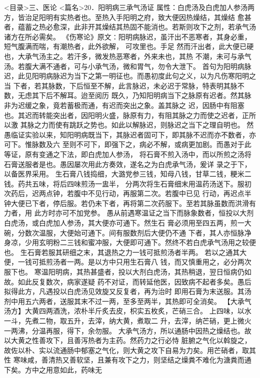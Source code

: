 \documentclass[a4paper,12pt,UTF8,twoside]{ctexbook}
\begin{document}
<目录>三、医论
<篇名>20．阳明病三承气汤证
属性：白虎汤及白虎加人参汤两方，皆治足阳明有实热者也。至热入手阳明之府，致大便因热燥结，其燥结 
愈甚者，蕴蓄之热必愈深，此非开其燥结其热固不能消也。若斯则攻下之剂，若承气汤诸方在所必需矣。 
《伤寒论》原文∶阳明病脉迟，虽汗出不恶寒者，其身必重，短气腹满而喘，有潮热者，此外欲解， 
可攻里也。手足 然而汗出者，此大便已硬也，大承气汤主之。若汗多，微发热恶寒者，外来未也，其热 
不潮，未可与承气汤。若腹大满不通者，可与小承气汤，微和胃气，勿令大泄下。 
首句为阳明病脉迟，此见阳明病脉迟为当下之第一明征也。而愚初度此句之义，以为凡伤寒阳明之当 
下者，若其脉数，下后恒至不解，此言脉迟，未必迟于常脉，特表明其脉不数，无虑其下后不解耳。迨至阅历 
既久，乃知阳明病当下之脉原有迟者。然其脉非为迟缓之象，竟若蓄极而通，有迟而突出之象。盖其脉之 
迟，因肠中有阻塞也。其迟而转能突出者，因阳明火盛，脉原有力，有阻其脉之力而使之迟者，正所以激 
其脉之力而使有跳跃之势也。如此以解脉迟，则脉迟之当下之理自明也。 
然愚临证实验以来，知阳明病既当下，其脉迟者固可下，即其脉不迟而亦不数者，亦可下。惟脉数及六 
至则不可下，即强下之，病必不解，或病更加剧。而愚对于此等证，原有变通之下法，即白虎加人参汤， 
将石膏不煎入汤中，而以所煎之汤将石膏送服者是也。愚因屡次用此方奏效，遂名之为白虎承气汤，爰详 
录之于下，以备医界采用。 
生石膏八钱捣细，大潞党参三钱，知母八钱，甘草二钱，粳米二钱。药共五味，将后四味煎汤一盅半， 
分两次将生石膏细末用温药汤送下。服初次药后，迟两点钟，若腹中不见行动，再服第二次。若腹中已见 
行动，再迟点半钟大便已下者，停后服。若仍未下者，再将第二次药服下。至若其脉虽数而洪滑有力者，用 
此方时亦可不加党参。 
愚从前遇寒温证之当下而脉象数者，恒投以大剂白虎汤，或白虎加人参汤，其大便亦可通下。然生石 
膏必须用至四五两，煎一大碗，分数次温服，大便始可通下。间有服数剂后大便仍不通 
下者，其人亦恒脉净身凉，少用玄明粉二三钱和蜜冲服，大便即可通下。然终不若白虎承气汤用之较便也。 
生石膏若服其研细之末，其退热之力一钱可抵煎汤者半两。 
若以之通其大便，一钱可抵煎汤者一两。是以方中只用生石膏八 
钱，而又慎重用之，必分两次服下也。 
寒温阳明病，其热甚盛者，投以大剂白虎汤，其热稍退，翌日恒病仍如故。如此反复数次，病家遂疑 
药不对证，而转延他医，因致病不起者多矣。愚后拟得此方，凡遇投以白虎汤见效旋又反复者，再为治时 
即用石膏为末送服。其汤剂中用五六两者，送服其末不过一两，至多至两半，其热即可全消矣。 
【大承气汤方】大黄四两酒洗，浓朴半斤炙去皮，枳实五枚炙，芒硝三合。 
上四味，以水一斗，先煮二物，取五升，去滓，纳大黄，煮取二 
升，去滓，纳芒硝，更上微火一两沸，分温再服，得下，余勿服。 
大承气汤方，所以通肠中因热之燥结也。故以大黄之性善攻下，且善泻热者为主药。然药力之行必恃 
脏腑之气化以斡旋之，故佐以朴、实以流通肠中郁塞之气化，则大黄之攻下自易为力矣。用芒硝者，取其性 
寒味咸，善清热又善软坚，且兼有攻下之力，则坚结之燥粪不难化为溏粪而通下矣。方中之用意如此，药味无 
\end{document}
